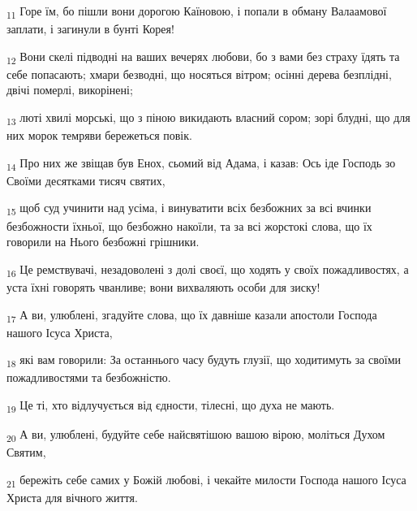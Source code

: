 \begin{tcolorbox}
\textsubscript{11} Горе їм, бо пішли вони дорогою Каїновою, і попали в обману Валаамової заплати, і загинули в бунті Корея!
\end{tcolorbox}
\begin{tcolorbox}
\textsubscript{12} Вони скелі підводні на ваших вечерях любови, бо з вами без страху їдять та себе попасають; хмари безводні, що носяться вітром; осінні дерева безплідні, двічі померлі, викорінені;
\end{tcolorbox}
\begin{tcolorbox}
\textsubscript{13} люті хвилі морські, що з піною викидають власний сором; зорі блудні, що для них морок темряви бережеться повік.
\end{tcolorbox}
\begin{tcolorbox}
\textsubscript{14} Про них же звіщав був Енох, сьомий від Адама, і казав: Ось іде Господь зо Своїми десятками тисяч святих,
\end{tcolorbox}
\begin{tcolorbox}
\textsubscript{15} щоб суд учинити над усіма, і винуватити всіх безбожних за всі вчинки безбожности їхньої, що безбожно накоїли, та за всі жорстокі слова, що їх говорили на Нього безбожні грішники.
\end{tcolorbox}
\begin{tcolorbox}
\textsubscript{16} Це ремствувачі, незадоволені з долі своєї, що ходять у своїх пожадливостях, а уста їхні говорять чванливе; вони вихваляють особи для зиску!
\end{tcolorbox}
\begin{tcolorbox}
\textsubscript{17} А ви, улюблені, згадуйте слова, що їх давніше казали апостоли Господа нашого Ісуса Христа,
\end{tcolorbox}
\begin{tcolorbox}
\textsubscript{18} які вам говорили: За останнього часу будуть глузії, що ходитимуть за своїми пожадливостями та безбожністю.
\end{tcolorbox}
\begin{tcolorbox}
\textsubscript{19} Це ті, хто відлучується від єдности, тілесні, що духа не мають.
\end{tcolorbox}
\begin{tcolorbox}
\textsubscript{20} А ви, улюблені, будуйте себе найсвятішою вашою вірою, моліться Духом Святим,
\end{tcolorbox}
\begin{tcolorbox}
\textsubscript{21} бережіть себе самих у Божій любові, і чекайте милости Господа нашого Ісуса Христа для вічного життя.
\end{tcolorbox}
